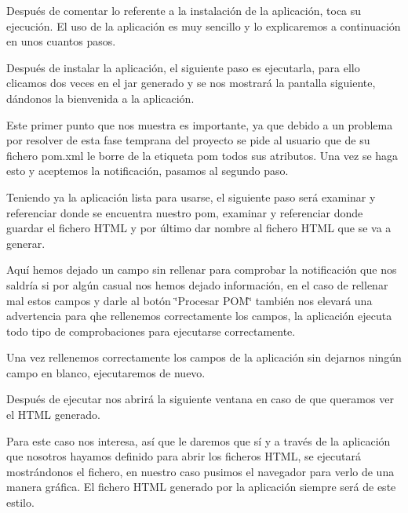 Después de comentar lo referente a la instalación de la aplicación, toca su ejecución. El uso de la aplicación es muy sencillo y lo explicaremos a continuación en unos cuantos pasos.


\begin{DoxyEnumerate}
\item Después de instalar la aplicación, el siguiente paso es ejecutarla, para ello clicamos dos veces en el jar generado y se nos mostrará la pantalla siguiente, dándonos la bienvenida a la aplicación.
\end{DoxyEnumerate}



Este primer punto que nos muestra es importante, ya que debido a un problema por resolver de esta fase temprana del proyecto se pide al usuario que de su fichero pom.\+xml le borre de la etiqueta pom todos sus atributos. Una vez se haga esto y aceptemos la notificación, pasamos al segundo paso.




\begin{DoxyEnumerate}
\item Teniendo ya la aplicación lista para usarse, el siguiente paso será examinar y referenciar donde se encuentra nuestro pom, examinar y referenciar donde guardar el fichero H\+T\+ML y por último dar nombre al fichero H\+T\+ML que se va a generar.
\end{DoxyEnumerate}





Aquí hemos dejado un campo sin rellenar para comprobar la notificación que nos saldría si por algún casual nos hemos dejado información, en el caso de rellenar mal estos campos y darle al botón \char`\"{}\+Procesar P\+O\+M\char`\"{} también nos elevará una advertencia para qhe rellenemos correctamente los campos, la aplicación ejecuta todo tipo de comprobaciones para ejecutarse correctamente.


\begin{DoxyEnumerate}
\item Una vez rellenemos correctamente los campos de la aplicación sin dejarnos ningún campo en blanco, ejecutaremos de nuevo.
\end{DoxyEnumerate}



Después de ejecutar nos abrirá la siguiente ventana en caso de que queramos ver el H\+T\+ML generado.



Para este caso nos interesa, así que le daremos que sí y a través de la aplicación que nosotros hayamos definido para abrir los ficheros H\+T\+ML, se ejecutará mostrándonos el fichero, en nuestro caso pusimos el navegador para verlo de una manera gráfica. El fichero H\+T\+ML generado por la aplicación siempre será de este estilo.



